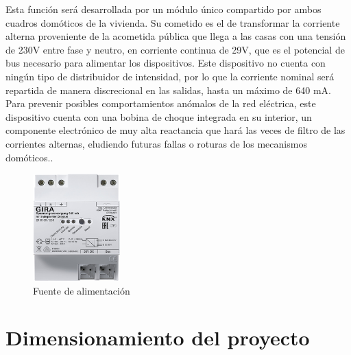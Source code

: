 Esta función será desarrollada por un módulo único compartido por ambos cuadros domóticos de la vivienda. Su cometido es el de transformar la corriente alterna proveniente de la acometida pública que llega a las casas con una tensión de 230V entre fase y neutro, en corriente continua de 29V, que es el potencial de bus necesario para alimentar los dispositivos. Este dispositivo no cuenta con ningún tipo de distribuidor de intensidad, por lo que la corriente nominal será repartida de manera discrecional en las salidas, hasta un máximo de 640 mA. Para prevenir posibles comportamientos anómalos de la red eléctrica, este dispositivo cuenta con una bobina de choque integrada en su interior, un componente electrónico de muy alta reactancia que hará las veces de filtro de las corrientes alternas, eludiendo futuras fallas o roturas de los mecanismos domóticos..
\begin{figure}[H]
\centering
\includegraphics[width=0.3\textwidth]{figures/fuente_alimentacion.png}   
\caption{Fuente de alimentación}
\label{fig:fuente_alimentacion}
\end{figure}



\section{Dimensionamiento del proyecto}

